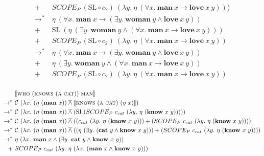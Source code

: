 \documentclass{article}
\newcommand{\abs}[1]{\textsc{#1}}
\newcommand{\obj}[1]{\textbf{#1}}
\newcommand{\sem}[1]{\llbracket #1 \rrbracket}
\newcommand{\dand}{\mathbin{\overline{\land}}}
\begin{document}
\begin{align*}
  +\ & SCOPE_P\ (\mathrm{SL} \circ c_2)\ (\lambda y.\ \eta\ (\forall x.\
  \obj{man}\ x \rightarrow \obj{love}\ x\ y))) \\
  \rightarrow^*\ & \eta\ (\forall x.\ \obj{man}\ x
  \rightarrow (\exists y.\ \obj{woman}\ y \land \obj{love}\ x\ y)) \\
  +\ & \mathrm{SL}\ (\eta\ (\exists y.\ \obj{woman}\ y \land (\forall x.\
  \obj{man}\ x \rightarrow \obj{love}\ x\ y))) \\
  +\ & SCOPE_P\ (\mathrm{SL} \circ c_2)\ (\lambda y.\ \eta\ (\forall x.\
  \obj{man}\ x \rightarrow \obj{love}\ x\ y)) \\
  \rightarrow^*\ & \eta\ (\forall x.\ \obj{man}\ x
  \rightarrow (\exists y.\ \obj{woman}\ y \land \obj{love}\ x\ y)) \\
  +\ & \eta\ (\exists y.\ \obj{woman}\ y \land (\forall x.\
  \obj{man}\ x \rightarrow \obj{love}\ x\ y)) \\
  +\ & SCOPE_P\ (\mathrm{SL} \circ c_2)\ (\lambda y.\ \eta\ (\forall x.\
  \obj{man}\ x \rightarrow \obj{love}\ x\ y)) \\
\end{align*}

\begin{align*}
  & \sem{\abs{who}\ (\abs{knows}\ (\abs{a}\ \abs{cat}))\ \abs{man}} \\
  \rightarrow^*\ & \mathcal{C}\ (\lambda x.\ (\eta\ (\obj{man}\ x)) \dand
  \sem{\abs{knows}\ (\abs{a}\ \abs{cat})\ (\eta\ x)}) \\
  \rightarrow^*\ & \mathcal{C}\ (\lambda x.\ (\eta\ (\obj{man}\ x)) \dand
  (\mathrm{SI}\ (SCOPE_P\ c_{cat}\ (\lambda y.\ \eta\ (\obj{know}\ x\ y))))) \\
  \rightarrow^*\ & \mathcal{C}\ (\lambda x.\ (\eta\ (\obj{man}\ x)) \dand
  ((c_{cat}\ (\lambda y.\ \eta\ (\obj{know}\ x\ y))) +
  (SCOPE_P\ c_{cat}\ (\lambda y.\ \eta\ (\obj{know}\ x\ y)))) \\
  \rightarrow^*\ & \mathcal{C}\ (\lambda x.\ (\eta\ (\obj{man}\ x)) \dand
  ((\eta\ (\exists y.\ (\obj{cat}\ y \land \obj{know}\ x\ y))) +
  (SCOPE_P\ c_{cat}\ (\lambda y.\ \eta\ (\obj{know}\ x\ y)))) \\
  \rightarrow^*\ & \eta\ (\lambda x.\ \obj{man}\ x \land
  (\exists y.\ \obj{cat}\ y \land \obj{know}\ x\ y)) \\
  +\ & SCOPE_P\ c_{cat}\ (\lambda y.\ \eta\ (\lambda x.\ (\obj{man}\ x \land \obj{know}\ x\ y))) \\
\end{align*}
\end{document}
